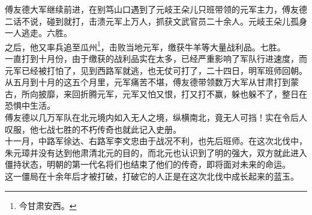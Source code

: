 \begin{multicols}{\theparacolNo}
傅友德大军继续前进，在别笃山口遇到了元岐王朵儿只班带领的元军主力，傅友德二话不说，碰到就打，击溃元军上万人，抓获文武官员二十余人。元岐王朵儿孤身一人逃走。六胜。\\

之后，他又率兵追至瓜州\footnote{今甘肃安西。}，击败当地元军，缴获牛羊等大量战利品。七胜。\\

一直打到十月份，由于缴获的战利品实在太多，已经严重影响了军队行进速度，而元军已经被打怕了，见到西路军就逃，也无仗可打了，二十四日，明军班师回朝。\\

从五月到十月的这五个月里，元军痛苦不堪，傅友德带领数万大军从甘肃打到蒙古，所向披靡，来回折腾元军，元军又怕又恨，打又打不赢，躲也躲不了，整日在恐惧中生活。\\

傅友德以几万军队在北元境内如入无人之境，纵横南北，竟无人可挡！实在令后人叹服，他七战七胜的不朽传奇也就此记入史册。\\

十一月，中路军徐达、右路军李文忠由于战况不利，也先后班师。在这次北伐中，朱元璋并没有达到他肃清北元的目的，而北元也认识到了明的强大，双方就此进入僵持状态，明朝的第一代名将们也结束了他们的传奇，即将面对未来的命运。\\

这一僵局在十余年后才被打破，打破它的人正是在这次北伐中成长起来的蓝玉。\\
\ifnum{}
	\end{multicols}
\fi
\newpage
